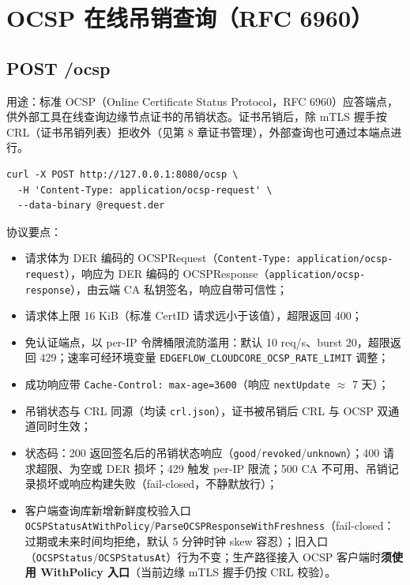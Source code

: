 \section{OCSP 在线吊销查询（RFC 6960）}

\subsection{POST /ocsp}

用途：标准 OCSP（Online Certificate Status Protocol，RFC 6960）应答端点，供外部工具在线查询边缘节点证书的吊销状态。证书吊销后，除 mTLS 握手按 CRL（证书吊销列表）拒收外（见第 8 章证书管理），外部查询也可通过本端点进行。

\begin{lstlisting}
curl -X POST http://127.0.0.1:8080/ocsp \
  -H 'Content-Type: application/ocsp-request' \
  --data-binary @request.der
\end{lstlisting}

协议要点：

\begin{itemize}
  \item 请求体为 DER 编码的 OCSPRequest（\texttt{Content-Type: application/ocsp-request}），响应为 DER 编码的 OCSPResponse（\texttt{application/ocsp-response}），由云端 CA 私钥签名，响应自带可信性；
  \item 请求体上限 16 KiB（标准 CertID 请求远小于该值），超限返回 400；
  \item 免认证端点，以 per-IP 令牌桶限流防滥用：默认 10 req/s、burst 20，超限返回 429；速率可经环境变量 \texttt{EDGEFLOW\_CLOUDCORE\_OCSP\_RATE\_LIMIT} 调整；
  \item 成功响应带 \texttt{Cache-Control: max-age=3600}（响应 \texttt{nextUpdate} $\approx$ 7 天）；
  \item 吊销状态与 CRL 同源（均读 \texttt{crl.json}），证书被吊销后 CRL 与 OCSP 双通道同时生效；
  \item 状态码：200 返回签名后的吊销状态响应（\texttt{good}/\texttt{revoked}/\texttt{unknown}）；400 请求超限、为空或 DER 损坏；429 触发 per-IP 限流；500 CA 不可用、吊销记录损坏或响应构建失败（fail-closed，不静默放行）；
  \item 客户端查询库新增新鲜度校验入口 \texttt{OCSPStatusAtWithPolicy}/\texttt{ParseOCSPResponseWithFreshness}（fail-closed：过期或未来时间均拒绝，默认 5 分钟时钟 skew 容忍）；旧入口（\texttt{OCSPStatus}/\texttt{OCSPStatusAt}）行为不变；生产路径接入 OCSP 客户端时\textbf{须使用 WithPolicy 入口}（当前边缘 mTLS 握手仍按 CRL 校验）。
\end{itemize}

